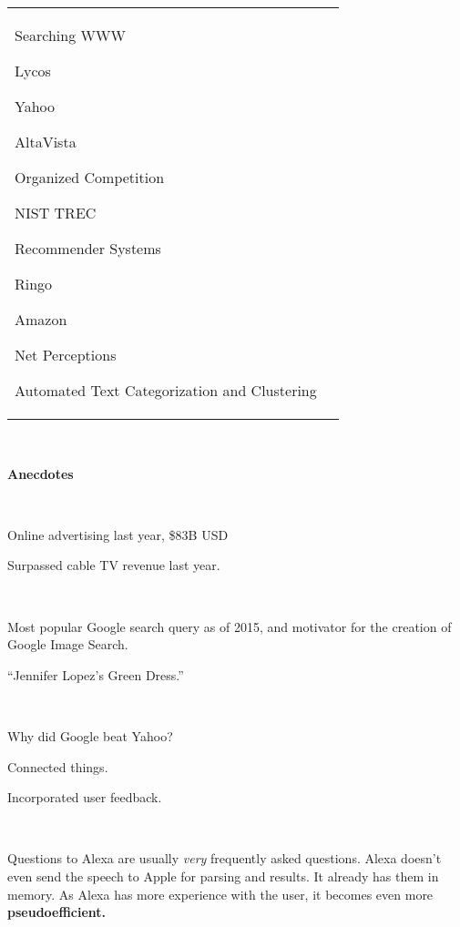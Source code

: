 \documentclass[11pt]{article}
\begin{document}
\begin{spacing}{1.2}
\begin{tabular}{p{3cm}p{15cm}}
	Searching WWW
	
	\qquad Lycos
	
	\qquad Yahoo
	
	\qquad AltaVista
	
	Organized Competition
	
	\qquad NIST TREC
	
	Recommender Systems
	
	\qquad Ringo
	
	\qquad Amazon
	
	\qquad Net Perceptions
	
	Automated Text Categorization and Clustering	
\end{tabular}

\

{\bf Anecdotes}

\

Online advertising last year, \$83B USD

Surpassed cable TV revenue last year.  

\

Most popular Google search query as of 2015, and motivator for the creation of Google Image Search.  

``Jennifer Lopez's Green Dress.''

\

Why did Google beat Yahoo?

Connected things.  

Incorporated user feedback.  

\

Questions to Alexa are usually {\it very} frequently asked questions.  Alexa doesn't even send the speech to Apple for parsing and results.  It already has them in memory.  As Alexa has more experience with the user, it becomes even more {\bf pseudoefficient.}

\



\end{spacing}
\end{document}
